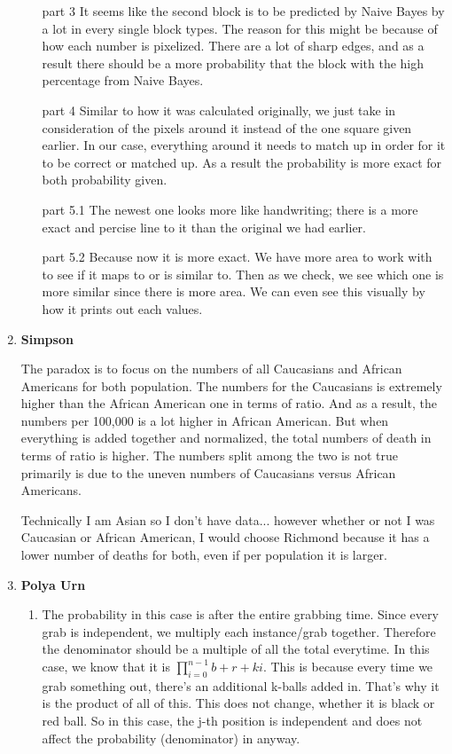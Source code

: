 \documentclass[12pt,fleqn]{article}
\begin{document}
\begin{enumerate}
\begin{enumerate}
  		\item[part 3] It seems like the second block is to be predicted by Naive Bayes by a lot in every single block types. The reason for this might be because of how each number is pixelized. There are a lot of sharp edges, and as a result there should be a more probability that the block with the high percentage from Naive Bayes. 
  		\item[part 4] Similar to how it was calculated originally, we just take in consideration of the pixels around it instead of the one square given earlier. In our case, everything around it needs to match up in order for it to be correct or matched up. As a result the probability is more exact for both probability given.
  		\item[part 5.1] The newest one looks more like handwriting; there is a more exact and percise line to it than the original we had earlier.
  		\item[part 5.2] Because now it is more exact. We have more area to work with to see if it maps to or is similar to. Then as we check, we see which one is more similar since there is more area. We can even see this visually by how it prints out each values. 
	\end{enumerate}    
  
  \newpage
  \item \textbf{Simpson}

	The paradox is to focus on the numbers of all Caucasians and African Americans for both population. The numbers for the Caucasians is extremely higher than the African American one in terms of ratio. And as a result, the numbers per 100,000 is a lot higher in African American. But when everything is added together and normalized, the total numbers of death in terms of ratio is higher. The numbers split among the two is not true primarily is due to the uneven numbers of Caucasians versus African Americans. 
	
	Technically I am Asian so I don't have data... however whether or not I was Caucasian or African American, I would choose Richmond because it has a lower number of deaths for both, even if per population it is larger. 
  \newpage
  \item \textbf{Polya Urn}
  	\begin{enumerate}
  		\item The probability in this case is after the entire grabbing time. Since every grab is independent, we multiply each instance/grab together. Therefore the denominator should be a multiple of all the total everytime. In this case, we know that it is $\prod_{i = 0}^{n-1} b + r + ki$. This is because every time we grab something out, there's an additional k-balls added in. That's why it is the product of all of this. This does not change, whether it is black or red ball. So in this case, the j-th position is independent and does not affect the probability (denominator) in anyway. 
  		

\end{enumerate}
\end{enumerate}
\end{document}
